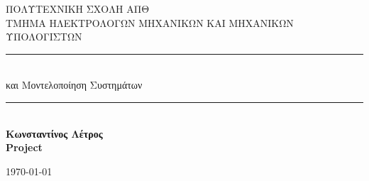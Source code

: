 \documentclass[12pt]{article}
\begin{document}
\author{Κωνσταντίνος Λέτρος 8851}

 \begin{titlepage} %
	\newcommand{\HRule}{\rule{\linewidth}{0.5mm}} %
	
	\center %
	
	
	\textsc{\LARGE ΠΟΛΥΤΕΧΝΙΚΗ ΣΧΟΛΗ ΑΠΘ}\\[1.5cm] %
	
	\textsc{\Large ΤΜΗΜΑ ΗΛΕΚΤΡΟΛΟΓΩΝ ΜΗΧΑΝΙΚΩΝ ΚΑΙ ΜΗΧΑΝΙΚΩΝ ΥΠΟΛΟΓΙΣΤΩΝ}\\[0.5cm] %
	
	 
	
	
	\HRule\\[0.4cm]
	
	{\huge{} και Μοντελοποίηση Συστημάτων}\\[0.4cm] %
	
	\HRule\\[1.5cm]
	
	{\huge\bfseries Κωνσταντίνος Λέτρος }\\[0.4cm]	
	\vfill	
	{\huge\bfseries Project}\\[0.4cm]  %
	
	
	\vfill\vfill\vfill %
	
	{\large\today} %
	
	
	 
	
	\vfill %
	
\end{titlepage}
\end{document}
